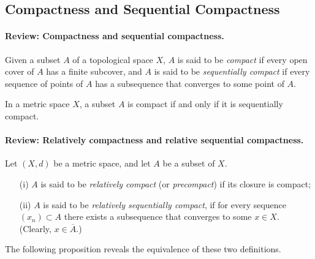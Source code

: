 \documentclass{article}
\begin{document}
\newpage
\subsection{Compactness and Sequential Compactness}
\paragraph{Review: Compactness and sequential compactness.} Given a subset $A$ of a topological space $X$, $A$ is said to be \textit{compact} if every open cover of $A$ has a finite subcover, and $A$ is said to be \textit{sequentially compact} if every sequence of points of $A$ has a subsequence that converges to some point of $A$.

In a metric space $X$, a subset $A$ is compact if and only if it is sequentially compact.

\paragraph{Review: Relatively compactness and relative sequential compactness.} Let $(X,d)$ be a metric space, and let $A$ be a subset of $X$. 
\begin{itemize}
	\item[(i)] $A$ is said to be \textit{relatively compact} (or \textit{precompact}) if its closure is compact;
	\item[(ii)] $A$ is said to be \textit{relatively sequentially compact}, if for every sequence $(x_n)\subset A$ there exists a subsequence that converges to some $x\in X$. (Clearly, $x\in\overline{A}$.)
\end{itemize}

The following proposition reveals the equivalence of these two definitions.
\end{document}
